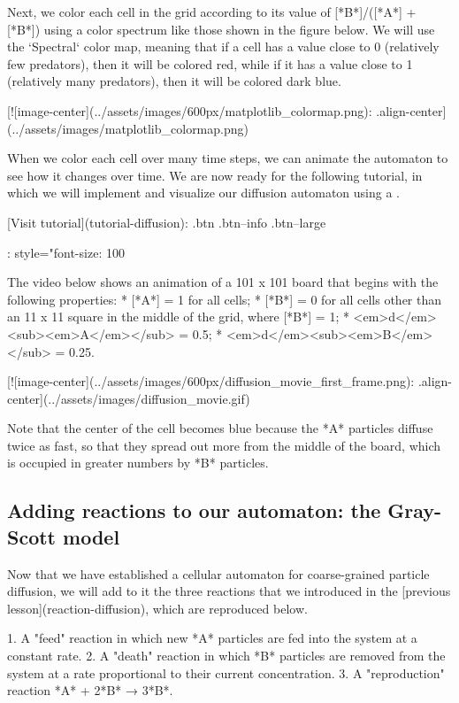 {{{{{{{{{Next, we color each cell in the grid according to its value of [*B*]/([*A*] + [*B*]) using a color spectrum like those shown in the figure below. We will use the `Spectral` color map, meaning that if a cell has a value close to 0 (relatively few predators), then it will be colored red, while if it has a value close to 1 (relatively many predators), then it will be colored dark blue.

[![image-center](../assets/images/600px/matplotlib_colormap.png){: .align-center}](../assets/images/matplotlib_colormap.png)

When we color each cell over many time steps, we can animate the automaton to see how it changes over time. We are now ready for the following tutorial, in which we will implement and visualize our diffusion automaton using a .

[Visit tutorial](tutorial-diffusion){: .btn .btn--info .btn--large}
{: style="font-size: 100%

The video below shows an animation of a 101 x 101 board that begins with the following properties:
* [*A*] = 1 for all cells;
* [*B*] = 0 for all cells other than an 11 x 11 square in the middle of the grid, where [*B*] = 1;
* <em>d</em><sub><em>A</em></sub> = 0.5;
* <em>d</em><sub><em>B</em></sub> = 0.25.

[![image-center](../assets/images/600px/diffusion_movie_first_frame.png){: .align-center}](../assets/images/diffusion_movie.gif)

Note that the center of the cell becomes blue because the *A* particles diffuse twice as fast, so that they spread out more from the middle of the board, which is occupied in greater numbers by *B* particles.

\FloatBarrier
{}
\subsection{Adding reactions to our automaton: the Gray-Scott model}

Now that we have established a cellular automaton for coarse-grained particle diffusion, we will add to it the three reactions that we introduced in the [previous lesson](reaction-diffusion), which are reproduced below.

1. A "feed" reaction in which new *A* particles are fed into the system at a constant rate.
2. A "death" reaction in which *B* particles are removed from the system at a rate proportional to their current concentration.
3. A "reproduction" reaction *A* + 2*B* → 3*B*.

}}}}}}}}}}
